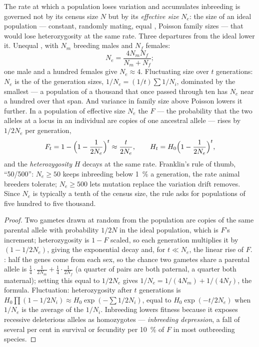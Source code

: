 \begin{theorem}\label{thm:b3:conservation-biology:ne}
The rate at which a population loses variation and accumulates
inbreeding is governed not by its census size $N$ but by its
\emph{effective size} $N_{e}$: the size of an ideal population ---
constant, randomly mating, equal , Poisson family sizes --- that
would lose heterozygosity at the same rate. Three departures from the
ideal lower it. Unequal , with $N_{m}$ breeding males and
$N_{f}$ females:
\[
N_{e} = \frac{4N_{m}N_{f}}{N_{m} + N_{f}} ;
\]
one male and a hundred females give $N_{e} \approx 4$. Fluctuating size
over $t$ generations: $N_{e}$ is the \emph{} of the
generation sizes, $1/N_{e} = (1/t)\sum 1/N_{i}$, dominated by the
smallest --- a population of a thousand that once passed through ten
has $N_{e}$ near a hundred over that span. And variance in family size
above Poisson lowers it further. In a population of effective size
$N_{e}$ the \emph{} $F$ --- the probability that
the two alleles at a locus in an individual are copies of one ancestral
allele --- rises by $1/2N_{e}$ per generation,
\[
F_{t} = 1 - \Bigl(1 - \frac{1}{2N_{e}}\Bigr)^{t} \approx \frac{t}{2N_{e}},
\qquad H_{t} = H_{0}\Bigl(1 - \frac{1}{2N_{e}}\Bigr)^{t} ,
\]
and the \emph{heterozygosity} $H$ decays at the same rate. Franklin's
rule of thumb, ``50/500'': $N_{e} \ge 50$ keeps inbreeding below
\qty{1}{\%} a generation, the rate animal breeders tolerate; $N_{e} \ge
500$ lets mutation replace the variation drift removes. Since $N_{e}$
is typically a tenth of the census size, the rule asks for populations
of five hundred to five thousand.
\end{theorem}
\begin{proof}
Two gametes drawn at random from the population are copies of the same
parental allele with probability $1/2N$ in the ideal population, which
is $F$'s increment; heterozygosity is $1 - F$ scaled, so each
generation multiplies it by $(1 - 1/2N_{e})$, giving the exponential
decay and, for $t \ll N_{e}$, the linear rise of $F$. : half
the genes come from each sex, so the chance two gametes share a
parental allele is $\tfrac{1}{4}\cdot\tfrac{1}{2N_{m}} +
\tfrac{1}{4}\cdot\tfrac{1}{2N_{f}}$ (a quarter of pairs are both
paternal, a quarter both maternal); setting this equal to $1/2N_{e}$
gives $1/N_{e} = 1/(4N_{m}) + 1/(4N_{f})$, the formula. Fluctuation:
heterozygosity after $t$ generations is $H_{0}\prod(1 - 1/2N_{i})
\approx H_{0}\exp(-\sum 1/2N_{i})$, equal to $H_{0}\exp(-t/2N_{e})$
when $1/N_{e}$ is the average of the $1/N_{i}$. Inbreeding lowers
fitness because it exposes recessive deleterious alleles as
homozygotes --- \emph{inbreeding depression}, a fall of several per cent
in survival or fecundity per \qty{10}{\%} of $F$ in most outbreeding
species.
\end{proof}

